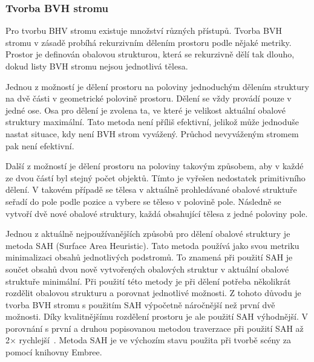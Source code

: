 \documentclass[czech,master]{diploma}
\begin{document}
\subsubsection*{Tvorba BVH stromu}
Pro tvorbu BHV stromu existuje množství různých přístupů. Tvorba BVH stromu v zásadě probíhá rekurzivním dělením prostoru podle nějaké metriky. Prostor je definován obalovou strukturou, která se rekurzivně dělí tak dlouho, dokud listy BVH stromu nejsou jednotlivá tělesa.\par
Jednou z možností je dělení prostoru na poloviny jednoduchým dělením struktury na dvě části v geometrické polovině prostoru. Dělení se vždy provádí pouze v jedné ose. Osa pro dělení je zvolena ta, ve které je velikost aktuální obalové struktury maximální. Tato metoda není příliš efektivní, jelikož může jednoduše nastat situace, kdy není BVH strom vyvážený. Průchod nevyváženým stromem pak není efektivní.\par
Další z možností je dělení prostoru na poloviny takovým způsobem, aby v každé ze dvou částí byl stejný počet objektů. Tímto je vyřešen nedostatek primitivního dělení. V takovém případě se tělesa v aktuálně prohledávané obalové struktuře seřadí do pole podle pozice a vybere se těleso v polovině pole. Následně se vytvoří dvě nové obalové struktury, každá obsahující tělesa z jedné poloviny pole.\par
Jednou z aktuálně nejpoužívanějších způsobů pro dělení obalové struktury je metoda SAH (Surface Area Heuristic). Tato metoda používá jako svou metriku minimalizaci obsahů jednotlivých podstromů. To znamená při použití SAH je součet obsahů dvou nově vytvořených obalových struktur v aktuální obalové struktuře minimální. Při použití této metody je při dělení potřeba několikrát rozdělit obalovou strukturu a porovnat jednotlivé možnosti. Z tohoto důvodu je tvorba BVH stromu s použitím SAH výpočetně náročnější než první dvě možnosti. Díky kvalitnějšímu rozdělení prostoru je ale použití SAH výhodnější. V porovnání s první a druhou popisovanou metodou traverzace při použití SAH až 2\(\times\) rychlejší~\cite{SAH}. Metoda SAH je ve výchozím stavu použita při tvorbě scény za pomocí knihovny Embree.
\end{document}
